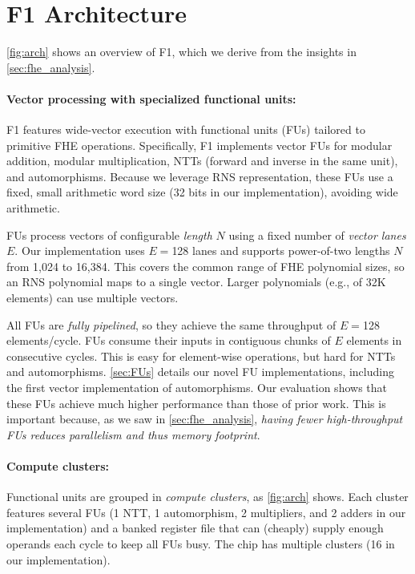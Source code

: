 \section{F1 Architecture}\label{sec:arch}

\autoref{fig:arch} shows an overview of F1, which we derive from the insights in \autoref{sec:fhe_analysis}.

\paragraph{Vector processing with specialized functional units:}
F1 features wide-vector execution with functional units (FUs) tailored to 
primitive FHE operations.
Specifically, F1 implements vector FUs for modular addition, modular multiplication, NTTs (forward and inverse in the same unit),
and automorphisms.
Because we leverage RNS representation, these FUs use a fixed, small arithmetic word size (32 bits in our implementation),
avoiding wide arithmetic.

FUs process vectors of configurable \emph{length} $N$ using a fixed number of \emph{vector lanes} $E$.
Our implementation uses $E=$128 lanes and supports power-of-two lengths $N$ from 1,024 to 16,384.
This covers the common range of FHE polynomial sizes, so an RNS polynomial maps to a single vector.
Larger polynomials (e.g., of 32K elements) can use multiple vectors.

All FUs are \emph{fully pipelined}, so they achieve the same throughput of $E=$128 elements/cycle.
FUs consume their inputs in contiguous chunks of $E$ elements in consecutive cycles.
This is easy for element-wise operations, but hard for NTTs and automorphisms.
\autoref{sec:FUs} details our novel FU implementations, including the first vector implementation of automorphisms.
Our evaluation shows that these FUs achieve much higher performance than those of prior work.
This is important because, as we saw in \autoref{sec:fhe_analysis},
\emph{having fewer high-throughput FUs reduces parallelism and thus memory footprint}.

\paragraph{Compute clusters:}
Functional units are grouped in \emph{compute clusters}, as \autoref{fig:arch} shows.
Each cluster features several FUs (1 NTT, 1 automorphism, 2 multipliers, and 2 adders in our implementation)
and a banked register file that can (cheaply) supply enough operands each cycle to keep all FUs busy.
The chip has multiple clusters (16 in our implementation).

